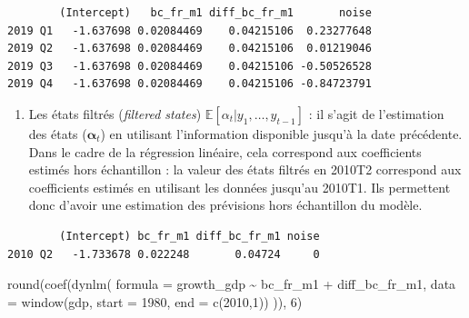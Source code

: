 \documentclass[
  a4paper,
  DIV=11,
  numbers=noendperiod,
  french]{scrartcl}
\newenvironment{Shaded}{\begin{snugshade}}{\end{snugshade}}
\newcommand{\AttributeTok}[1]{\textcolor[rgb]{0.40,0.45,0.13}{#1}}
\newcommand{\DecValTok}[1]{\textcolor[rgb]{0.68,0.00,0.00}{#1}}
\newcommand{\FunctionTok}[1]{\textcolor[rgb]{0.28,0.35,0.67}{#1}}
\newcommand{\NormalTok}[1]{\textcolor[rgb]{0.00,0.23,0.31}{#1}}
\newcommand{\SpecialCharTok}[1]{\textcolor[rgb]{0.37,0.37,0.37}{#1}}
\providecommand{\tightlist}{%
  \setlength{\itemsep}{0pt}\setlength{\parskip}{0pt}}\usepackage{longtable,booktabs,array}
\newcommand\1{{\mathds 1}}
\newcommand{\bf}[1]{{\boldsymbol #1}}
\newcommand{\E}[1]{\mathbb{E}\left[#1\right]}
\theoremstyle{remark}
\begin{document}
\begin{verbatim}
        (Intercept)   bc_fr_m1 diff_bc_fr_m1       noise
2019 Q1   -1.637698 0.02084469    0.04215106  0.23277648
2019 Q2   -1.637698 0.02084469    0.04215106  0.01219046
2019 Q3   -1.637698 0.02084469    0.04215106 -0.50526528
2019 Q4   -1.637698 0.02084469    0.04215106 -0.84723791
\end{verbatim}

\begin{enumerate}
\def\labelenumi{\arabic{enumi}.}
\setcounter{enumi}{1}
\tightlist
\item
  Les états filtrés (\emph{filtered states})
  \(\E{\alpha_t|y_1,\dots,y_{t-1}}\) : il s'agit de l'estimation des
  états (\(\bf\alpha_t\)) en utilisant l'information disponible jusqu'à
  la date précédente. Dans le cadre de la régression linéaire, cela
  correspond aux coefficients estimés hors échantillon : la valeur des
  états filtrés en 2010T2 correspond aux coefficients estimés en
  utilisant les données jusqu'au 2010T1. Ils permettent donc d'avoir une
  estimation des prévisions hors échantillon du modèle.
\end{enumerate}

\begin{Shaded}
\end{Shaded}

\begin{verbatim}
        (Intercept) bc_fr_m1 diff_bc_fr_m1 noise
2010 Q2   -1.733678 0.022248       0.04724     0
\end{verbatim}

\begin{Shaded}
\begin{Highlighting}[]
\FunctionTok{round}\NormalTok{(}\FunctionTok{coef}\NormalTok{(}\FunctionTok{dynlm}\NormalTok{(}
  \AttributeTok{formula =}\NormalTok{ growth\_gdp }\SpecialCharTok{\textasciitilde{}}\NormalTok{ bc\_fr\_m1 }\SpecialCharTok{+}\NormalTok{ diff\_bc\_fr\_m1,}
  \AttributeTok{data =} \FunctionTok{window}\NormalTok{(gdp, }\AttributeTok{start =} \DecValTok{1980}\NormalTok{, }\AttributeTok{end =} \FunctionTok{c}\NormalTok{(}\DecValTok{2010}\NormalTok{,}\DecValTok{1}\NormalTok{))}
\NormalTok{)), }\DecValTok{6}\NormalTok{)}
\end{Highlighting}
\end{Shaded}
\end{document}
